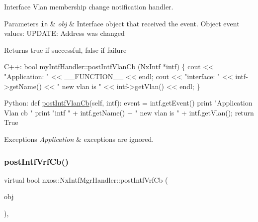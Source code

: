 Interface Vlan membership change notification handler. 
\begin{DoxyParams}[1]{Parameters}
\mbox{\tt in}  & {\em obj} & Interface object that received the event. Object event values\+: U\+P\+D\+A\+TE\+: Address was changed \\
\hline
\end{DoxyParams}
\begin{DoxyReturn}{Returns}
true if successful, false if failure
\end{DoxyReturn}

\begin{DoxyCode}
C++:
   \textcolor{keywordtype}{bool}  myIntfHandler::postIntfVlanCb (NxIntf *intf)
   \{
      cout << \textcolor{stringliteral}{"Application: "} << \_\_FUNCTION\_\_ << endl;
      cout << \textcolor{stringliteral}{"interface: "} << intf->getName() << 
           \textcolor{stringliteral}{" new vlan is "} << intf->getVlan() << endl;
   \}

Python:   
   def \mbox{\hyperlink{classnxos_1_1_nx_intf_mgr_handler_aad14cab2e803ceadef82870303db526c}{postIntfVlanCb}}(\textcolor{keyword}{self}, intf):
       event = intf.getEvent()
       print \textcolor{stringliteral}{"Application Vlan cb "}
       print \textcolor{stringliteral}{"intf "} + intf.getName() + \textcolor{stringliteral}{" new vlan is "} + 
         intf.getVlan();
       \textcolor{keywordflow}{return} True
\end{DoxyCode}



\begin{DoxyExceptions}{Exceptions}
{\em Application} & exceptions are ignored. \\
\hline
\end{DoxyExceptions}
\mbox{\label{classnxos_1_1_nx_intf_mgr_handler_aa6f8bc5b1cfa6d99e863c8ede3cafa5f}} 
\subsubsection{\texorpdfstring{post\+Intf\+Vrf\+Cb()}{postIntfVrfCb()}}
{\footnotesize\ttfamily virtual bool nxos\+::\+Nx\+Intf\+Mgr\+Handler\+::post\+Intf\+Vrf\+Cb (\begin{DoxyParamCaption}\item[{\mbox{\hyperlink{classnxos_1_1_nx_intf}{Nx\+Intf}} $\ast$}]{obj }\end{DoxyParamCaption})\hspace{0.3cm}{\ttfamily [inline]}, {\ttfamily [virtual]}}

